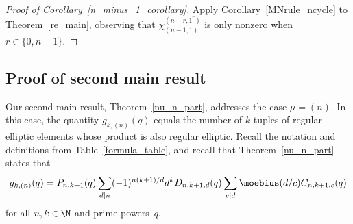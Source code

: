 \begin{proof}[Proof of Corollary~\ref{n_minus_1_corollary}]
Apply Corollary~\ref{MNrule_ncycle} to Theorem~\ref{re_main},
observing that \(\chi^{(n-r,1^r)}_{(n-1,1)}\) is only nonzero when \(r \in \{0,n-1\}\).
\end{proof}





























\subsection{Proof of second main result}
\label{nu_equals_n_section}

Our second main result, Theorem~\ref{nu_n_part}, addresses the case \(\mu = (n)\).
In this case, the quantity \(g_{k,(n)} (q)\) equals the number of \(k\)-tuples of regular elliptic elements whose product is also regular elliptic.
Recall the notation and definitions from Table~\ref{formula_table}, and recall that Theorem~\ref{nu_n_part} states that
\begin{equation}
g_{k,(n)}(q) = P_{n,k+1} (q)
\sum_{d \mid n}
(-1)^{n(k+1)/d}
d^{k}
D_{n,k+1,d} (q)
\sum_{c \mid d}
\moebius(d/c)
C_{n,k+1,c} (q)
\end{equation}
for all \(n, k \in \N\) and prime powers~\(q\).





